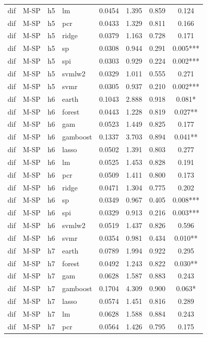\begin{ThreePartTable}
\begin{longtable}[t]{llclcccc}
dif & M-SP & h5 & lm & 0.0454 & 1.395 & 0.859 & 0.124\\
dif & M-SP & h5 & pcr & 0.0433 & 1.329 & 0.811 & 0.166\\
dif & M-SP & h5 & ridge & 0.0379 & 1.163 & 0.728 & 0.171\\
dif & M-SP & h5 & sp & 0.0308 & 0.944 & 0.291 & 0.005***\\
dif & M-SP & h5 & spi & 0.0303 & 0.929 & 0.224 & 0.002***\\
dif & M-SP & h5 & svmlw2 & 0.0329 & 1.011 & 0.555 & 0.271\\
dif & M-SP & h5 & svmr & 0.0305 & 0.937 & 0.210 & 0.002***\\
\addlinespace
dif & M-SP & h6 & earth & 0.1043 & 2.888 & 0.918 & 0.081*\\
dif & M-SP & h6 & forest & 0.0443 & 1.228 & 0.819 & 0.027**\\
dif & M-SP & h6 & gam & 0.0523 & 1.449 & 0.825 & 0.177\\
dif & M-SP & h6 & gamboost & 0.1337 & 3.703 & 0.894 & 0.041**\\
dif & M-SP & h6 & lasso & 0.0502 & 1.391 & 0.803 & 0.277\\
dif & M-SP & h6 & lm & 0.0525 & 1.453 & 0.828 & 0.191\\
dif & M-SP & h6 & pcr & 0.0509 & 1.411 & 0.800 & 0.173\\
dif & M-SP & h6 & ridge & 0.0471 & 1.304 & 0.775 & 0.202\\
dif & M-SP & h6 & sp & 0.0349 & 0.967 & 0.405 & 0.008***\\
dif & M-SP & h6 & spi & 0.0329 & 0.913 & 0.216 & 0.003***\\
dif & M-SP & h6 & svmlw2 & 0.0519 & 1.437 & 0.826 & 0.596\\
dif & M-SP & h6 & svmr & 0.0354 & 0.981 & 0.434 & 0.010**\\
\addlinespace
dif & M-SP & h7 & earth & 0.0789 & 1.994 & 0.922 & 0.295\\
dif & M-SP & h7 & forest & 0.0492 & 1.243 & 0.822 & 0.030**\\
dif & M-SP & h7 & gam & 0.0628 & 1.587 & 0.883 & 0.243\\
dif & M-SP & h7 & gamboost & 0.1704 & 4.309 & 0.900 & 0.063*\\
dif & M-SP & h7 & lasso & 0.0574 & 1.451 & 0.816 & 0.289\\
dif & M-SP & h7 & lm & 0.0628 & 1.588 & 0.884 & 0.243\\
dif & M-SP & h7 & pcr & 0.0564 & 1.426 & 0.795 & 0.175\\

\end{longtable}
\end{ThreePartTable}

